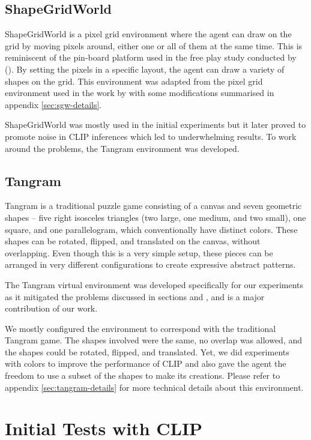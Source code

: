 \subsection{ShapeGridWorld}
\label{sec:sgw}
ShapeGridWorld is a pixel grid environment where the agent can draw on the grid by moving pixels around, either one or all of them at the same time.
This is reminiscent of the pin-board platform used in the free play study conducted by \citet{diggs} ().
By setting the pixels in a specific layout, the agent can draw a variety of shapes on the grid.
This environment was adapted from the pixel grid environment used in the work by \citet{rair} with some modifications summarised in appendix \ref{sec:sgw-details}.

ShapeGridWorld was mostly used in the initial experiments but it later proved to promote noise in CLIP inferences which led to underwhelming results.
To work around the problems, the Tangram environment was developed.

\subsection{Tangram}
\label{sec:tangram}
Tangram is a traditional puzzle game consisting of a canvas and seven geometric shapes -- five right isosceles triangles (two large, one medium, and two small), one square, and one parallelogram, which conventionally have distinct colors.
These shapes can be rotated, flipped, and translated on the canvas, without overlapping.
Even though this is a very simple setup, these pieces can be arranged in very different configurations to create expressive abstract patterns.

The Tangram virtual environment was developed specifically for our experiments as it mitigated the problems discussed in sections  and , and is a major contribution of our work.

We mostly configured the environment to correspond with the traditional Tangram game.
The shapes involved were the same, no overlap was allowed, and the shapes could be rotated, flipped, and translated.
Yet, we did experiments with colors to improve the performance of CLIP and also gave the agent the freedom to use a subset of the shapes to make its creations.
Please refer to appendix \ref{sec:tangram-details} for more technical details about this environment.

\section{Initial Tests with CLIP}
\label{sec:clip-custom}

